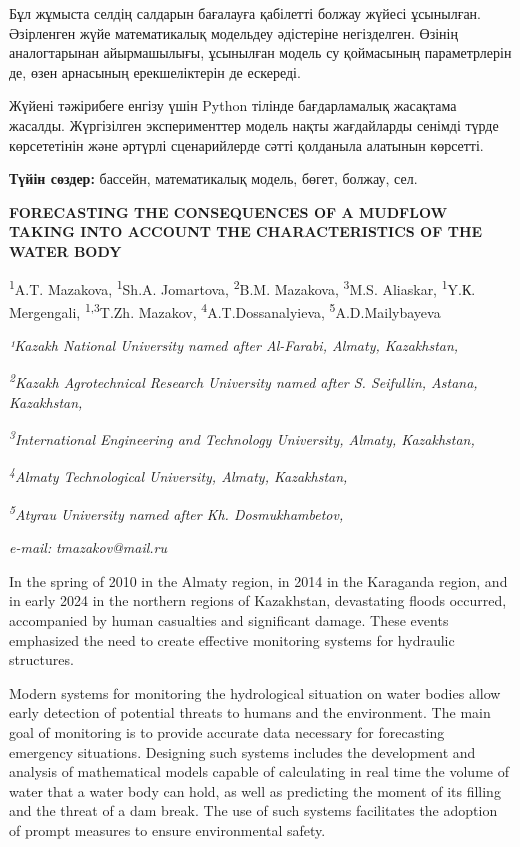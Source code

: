 Бұл жұмыста селдің салдарын бағалауға қабілетті болжау жүйесі ұсынылған.
Әзірленген жүйе математикалық модельдеу әдістеріне негізделген. Өзінің
аналогтарынан айырмашылығы, ұсынылған модель су қоймасының параметрлерін
де, өзен арнасының ерекшеліктерін де ескереді.

Жүйені тәжірибеге енгізу үшін Python тілінде бағдарламалық жасақтама
жасалды. Жүргізілген эксперименттер модель нақты жағдайларды сенімді
түрде көрсететінін және әртүрлі сценарийлерде сәтті қолданыла алатынын
көрсетті.

{\bfseries Түйін сөздер:} бассейн, математикалық модель, бөгет, болжау,
сел.

\begin{articleheader}
{\bfseries FORECASTING THE CONSEQUENCES OF A MUDFLOW TAKING INTO ACCOUNT
THE CHARACTERISTICS OF THE WATER BODY}

\textsuperscript{1}A.T. Mazakova,
\textsuperscript{1}Sh.A. Jomartova,
\textsuperscript{2}B.M. Mazakova,
\textsuperscript{3}M.S. Aliaskar,
\textsuperscript{1}Y.К. Mergengali,
\textsuperscript{1,3}T.Zh. Mazakov,
\textsuperscript{4}A.T.Dossanalyieva,
\textsuperscript{5}A.D.Mailybayeva
\end{articleheader}

\begin{affiliation}
\emph{¹Kazakh National University named after Al-Farabi, Almaty, Kazakhstan,}

\emph{\textsuperscript{2}Kazakh Agrotechnical Research University named after S. Seifullin, Astana, Kazakhstan,}

\emph{\textsuperscript{3}International Engineering and Technology University, Almaty, Kazakhstan,}

\emph{\textsuperscript{4}Almaty Technological University, Almaty, Kazakhstan,}

\emph{\textsuperscript{5}Atyrau University named after Kh. Dosmukhambetov,}

\emph{e-mail:} \emph{tmazakov@mail.ru}
\end{affiliation}

In the spring of 2010 in the Almaty region, in 2014 in the Karaganda
region, and in early 2024 in the northern regions of Kazakhstan,
devastating floods occurred, accompanied by human casualties and
significant damage. These events emphasized the need to create effective
monitoring systems for hydraulic structures.

Modern systems for monitoring the hydrological situation on water bodies
allow early detection of potential threats to humans and the
environment. The main goal of monitoring is to provide accurate data
necessary for forecasting emergency situations. Designing such systems
includes the development and analysis of mathematical models capable of
calculating in real time the volume of water that a water body can hold,
as well as predicting the moment of its filling and the threat of a dam
break. The use of such systems facilitates the adoption of prompt
measures to ensure environmental safety.

